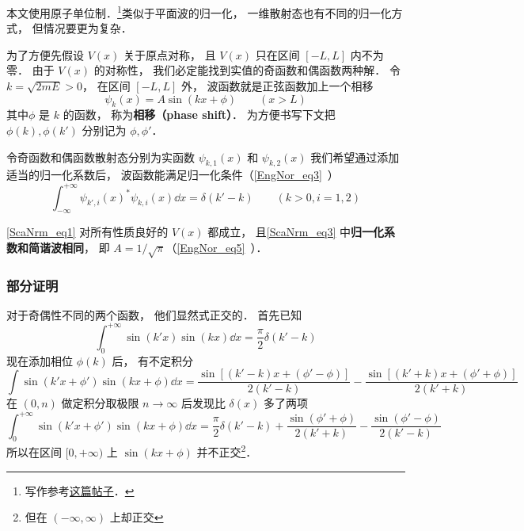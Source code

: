 
\begin{issues}
\issueDraft
\end{issues}

本文使用原子单位制．\footnote{写作参考\href{https://chaoli.club/index.php/4541/last}{这篇帖子}．}类似于平面波的归一化， 一维散射态也有不同的归一化方式， 但情况要更为复杂． 

为了方便先假设 $V(x)$ 关于原点对称， 且 $V(x)$ 只在区间 $[-L,L]$ 内不为零． 由于 $V(x)$ 的对称性， 我们必定能找到实值的奇函数和偶函数两种解． 令 $k = \sqrt{2mE} > 0$， 在区间 $[-L,L]$ 外， 波函数就是正弦函数加上一个相移
\begin{equation}\label{ScaNrm_eq3}
\psi_k(x) = A\sin(kx + \phi) \qquad (x > L)
\end{equation}
其中$\phi$ 是 $k$ 的函数， 称为\textbf{相移（phase shift）}． 为方便书写下文把 $\phi(k),\phi(k')$ 分别记为 $\phi, \phi'$．

令奇函数和偶函数散射态分别为实函数 $\psi_{k,1}(x)$ 和 $\psi_{k,2}(x)$ 我们希望通过添加适当的归一化系数后， 波函数能满足归一化条件（\autoref{EngNor_eq3}~）
\begin{equation}\label{ScaNrm_eq1}
\int_{-\infty}^{+\infty} \psi_{k',i}(x)^* \psi_{k,i}(x) \dd{x} = \delta(k' - k) \qquad (k > 0, i = 1, 2)
\end{equation}

\begin{theorem}{}
\autoref{ScaNrm_eq1} 对所有性质良好的 $V(x)$ 都成立， 且\autoref{ScaNrm_eq3} 中\textbf{归一化系数和简谐波相同}， 即 $A = 1/\sqrt{\pi}$（\autoref{EngNor_eq5}~）．
\end{theorem}

\subsubsection{部分证明}
对于奇偶性不同的两个函数， 他们显然式正交的． 首先已知
\begin{equation}
\int_{0}^{+\infty} \sin(k'x)\sin(kx)\dd{x} = \frac{\pi}{2}\delta(k'-k)
\end{equation}
现在添加相位 $\phi(k)$ 后， 有不定积分
\begin{equation}
\int \sin(k'x+\phi')\sin(kx+\phi) \dd{x} = \frac{\sin[(k'-k)x + (\phi'-\phi)]}{2(k'-k)}
- \frac{\sin[(k'+k)x+(\phi'+\phi)]}{2(k'+k)}
\end{equation}
在 $(0,n)$ 做定积分取极限 $n\to\infty$ 后发现比 $\delta(x)$ 多了两项
\begin{equation}
\int_{0}^{+\infty} \sin(k'x+\phi')\sin(kx+\phi) \dd{x} = \frac{\pi}{2}\delta(k'-k)
+ \frac{\sin(\phi'+\phi)}{2(k'+k)} - \frac{\sin(\phi'-\phi)}{2(k'-k)}
\end{equation}
所以在区间 $[0, +\infty)$ 上 $\sin(kx+\phi)$ 并不正交\footnote{但在 $(-\infty,\infty)$ 上却正交}．

